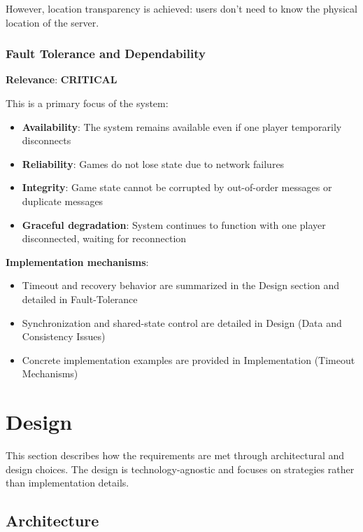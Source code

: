 \documentclass{scrartcl}
\begin{document}
However, location transparency is achieved: users don't need to know the physical location of the server.

\subsubsection{Fault Tolerance and Dependability}

\textbf{Relevance}: \textbf{CRITICAL}

This is a primary focus of the system:

\begin{itemize}
  \item \textbf{Availability}: The system remains available even if one player temporarily disconnects
  \item \textbf{Reliability}: Games do not lose state due to network failures
  \item \textbf{Integrity}: Game state cannot be corrupted by out-of-order messages or duplicate messages
  \item \textbf{Graceful degradation}: System continues to function with one player disconnected,
    waiting for reconnection
\end{itemize}

\textbf{Implementation mechanisms}:
\begin{itemize}
  \item Timeout and recovery behavior are summarized in the Design section and detailed in Fault-Tolerance
  \item Synchronization and shared-state control are detailed in Design (Data and Consistency Issues)
  \item Concrete implementation examples are provided in Implementation (Timeout Mechanisms)
\end{itemize}



\section{Design}\label{design}

This section describes how the requirements are met through architectural and design choices.
The design is technology-agnostic and focuses on strategies rather than implementation details.

\subsection{Architecture}\label{architecture}
\end{document}
